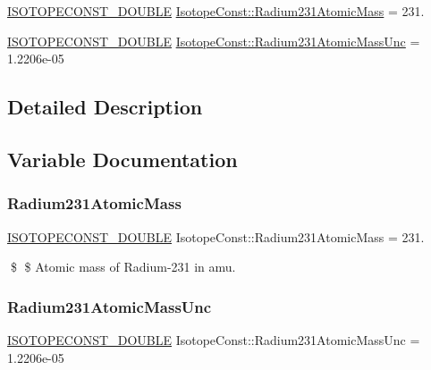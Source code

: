 \begin{DoxyCompactItemize}
\item 
\mbox{\hyperlink{group___isotope_const-_macros_ga8f45a7272ce02c0b4c65c44636ed719a}{I\+S\+O\+T\+O\+P\+E\+C\+O\+N\+S\+T\+\_\+\+D\+O\+U\+B\+LE}} \mbox{\hyperlink{group___isotope_const-_radium-_ra231_ga397ba9b60f8390c80e8d6a779d9354b4}{Isotope\+Const\+::\+Radium231\+Atomic\+Mass}} = 231.
\item 
\mbox{\hyperlink{group___isotope_const-_macros_ga8f45a7272ce02c0b4c65c44636ed719a}{I\+S\+O\+T\+O\+P\+E\+C\+O\+N\+S\+T\+\_\+\+D\+O\+U\+B\+LE}} \mbox{\hyperlink{group___isotope_const-_radium-_ra231_gaa5907274ae78d4d26540e503d9e8ac23}{Isotope\+Const\+::\+Radium231\+Atomic\+Mass\+Unc}} = 1.\+2206e-\/05
\end{DoxyCompactItemize}


\subsection{Detailed Description}


\subsection{Variable Documentation}
\mbox{\label{group___isotope_const-_radium-_ra231_ga397ba9b60f8390c80e8d6a779d9354b4}} 
\subsubsection{\texorpdfstring{Radium231\+Atomic\+Mass}{Radium231AtomicMass}}
{\footnotesize\ttfamily \mbox{\hyperlink{group___isotope_const-_macros_ga8f45a7272ce02c0b4c65c44636ed719a}{I\+S\+O\+T\+O\+P\+E\+C\+O\+N\+S\+T\+\_\+\+D\+O\+U\+B\+LE}} Isotope\+Const\+::\+Radium231\+Atomic\+Mass = 231.}

\$ \$ Atomic mass of Radium-\/231 in amu. \mbox{\label{group___isotope_const-_radium-_ra231_gaa5907274ae78d4d26540e503d9e8ac23}} 
\subsubsection{\texorpdfstring{Radium231\+Atomic\+Mass\+Unc}{Radium231AtomicMassUnc}}
{\footnotesize\ttfamily \mbox{\hyperlink{group___isotope_const-_macros_ga8f45a7272ce02c0b4c65c44636ed719a}{I\+S\+O\+T\+O\+P\+E\+C\+O\+N\+S\+T\+\_\+\+D\+O\+U\+B\+LE}} Isotope\+Const\+::\+Radium231\+Atomic\+Mass\+Unc = 1.\+2206e-\/05}

